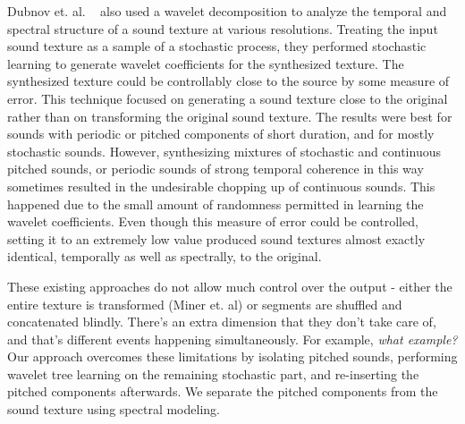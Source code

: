 \documentclass{acmsiggraph}               %
\begin{document}
Dubnov et. al. ~ also used a wavelet decomposition to 
analyze the temporal and spectral structure of a sound texture at various 
resolutions. Treating the input sound texture as a sample of a stochastic process, 
they performed stochastic learning to generate wavelet coefficients for the synthesized 
texture. The synthesized texture could be controllably close to the source by some measure of 
error. This technique focused on generating a sound texture close to the original rather than 
on transforming the original sound texture. The results were best for sounds with periodic or 
pitched components of short duration, and for mostly stochastic sounds. However, synthesizing 
mixtures of stochastic and continuous pitched sounds, or periodic sounds of strong temporal 
coherence in this way sometimes resulted in the undesirable chopping up of continuous sounds. This 
happened due to the small amount of randomness permitted in learning the wavelet coefficients. 
Even though this measure of error could be controlled, setting it to an extremely low value 
produced sound textures almost exactly identical, temporally as well as spectrally, to the 
original.

These existing approaches do not allow much control over the output - either the entire texture
is transformed (Miner et. al) or segments are shuffled and concatenated blindly. There's an extra
dimension that they don't take care of, and that's different events happening simultaneously.
For example, \textit{what example?}
Our approach overcomes these limitations by isolating pitched sounds, performing wavelet tree 
learning on the remaining stochastic part, and re-inserting the pitched components afterwards. 
We separate the pitched components from the sound texture using spectral modeling.


\end{document}

